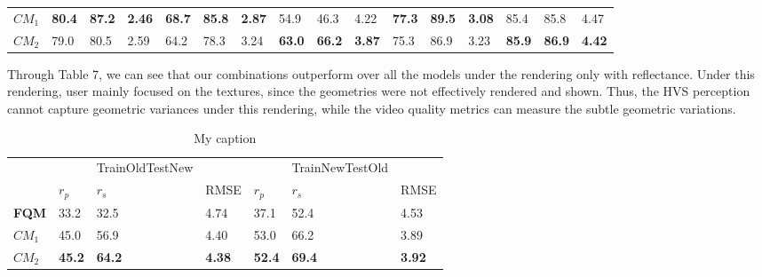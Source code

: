 \begin{table}[]
\begin{tabular}{llllllllllllllll}
$CM_1$                 & \textbf{80.4} & \textbf{87.2}     & \textbf{2.46} & \textbf{68.7} & \textbf{85.8} & \textbf{2.87} & 54.9          & 46.3                          & 4.22          & \textbf{77.3} & \textbf{89.5}      & \textbf{3.08} & 85.4          & 85.8           & 4.47          \\
$CM_2$                 & 79.0          & 80.5              & 2.59          & 64.2          & 78.3          & 3.24          & \textbf{63.0} & \textbf{66.2}                 & \textbf{3.87} & 75.3          & 86.9               & 3.23          & \textbf{85.9} & \textbf{86.9}  & \textbf{4.42}
\end{tabular}
\end{table}

Through Table 7, we can see that our combinations outperform over all the models under the rendering only with reflectance. Under this rendering, user mainly focused on the textures, since the geometries were not effectively rendered and shown. Thus, the HVS perception cannot capture geometric variances under this rendering, while the video quality metrics can measure the subtle geometric variations. \\

\begin{table}[]
\centering
\caption{My caption}
\label{my-label}
\begin{tabular}{lllllll}
             &               & TrainOldTestNew &               &               & TrainNewTestOld &               \\
             & $r_p$                & $r_s$             & RMSE          & $r_p$                & $r_s$               & RMSE          \\
\textbf{FQM} & 33.2          & 32.5           & 4.74          & 37.1         & 52.4            & 4.53          \\
\textbf{$CM_1$} & 45.0         & 56.9            & 4.40          & 53.0          & 66.2            & 3.89          \\
\textbf{$CM_2$} & \textbf{45.2} & \textbf{64.2}   & \textbf{4.38} & \textbf{52.4} & \textbf{69.4}   & \textbf{3.92}
\end{tabular}
\end{table}
